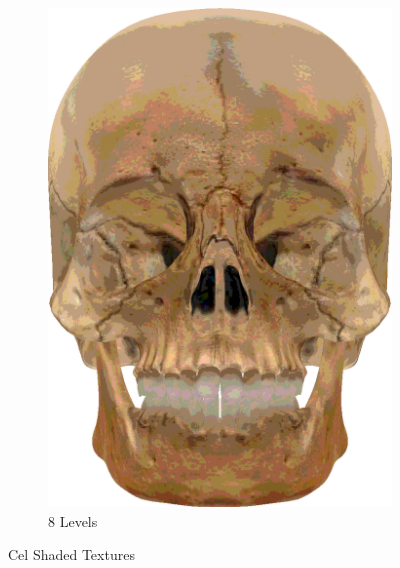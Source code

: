 \begin{figure}[h]
\begin{subfigure}[b]{0.16\textwidth}
        \includegraphics[width=\textwidth]{img/textures/CelShadeTexture8Skull.png}
        \caption{8 Levels}
        \label{fig:CelShadeTexture8Skull}
    \end{subfigure}
    \caption{Cel Shaded Textures}
    \label{fig:TexturesEngineer}
\end{figure}

